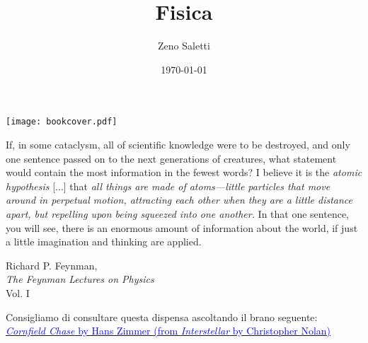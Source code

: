\documentclass{book}
\title{Fisica}
\author{Zeno Saletti}
\date{\today}
\begin{document}
\begin{titlepage}
    \pagecolor{brown}\afterpage{\nopagecolor}
    \texttt{[image: bookcover.pdf]} %

    \restoregeometry
\end{titlepage}

\epigraph{If, in some cataclysm, all of scientific knowledge were
to be destroyed, and only one sentence passed on to the next generations
of creatures, what statement would contain the most information in the
fewest words? I believe it is the \textit{atomic hypothesis} [...]
that \textit{all things are made of atoms—little particles that move
around in perpetual motion, attracting each other when they are a little
distance apart, but repelling upon being squeezed into one another.}
In that one sentence, you will see, there is an enormous amount of
information about the world, if just a little imagination and
thinking are applied.}{Richard P. Feynman,\\\textit{The Feynman Lectures on Physics}\\Vol. I}

\vspace*{9cm}
\begin{center}
Consigliamo di consultare questa dispensa ascoltando il brano seguente:\\
\href{https://www.youtube.com/watch?v=JuSsvM8B4Jc}{\textcolor{blue}{\textit{Cornfield Chase} by Hans Zimmer (from \textit{Interstellar} by Christopher Nolan)}}
\end{center}

\newpage


\newpage



\dominitoc %
\tableofcontents










\end{document}

